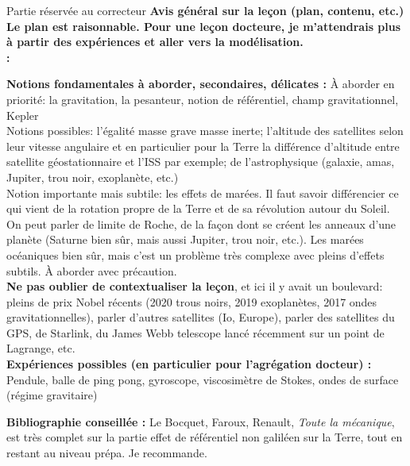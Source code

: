 \begin{reportBlock}{Partie réservée au correcteur}
  \textbf{Avis général sur la leçon (plan, contenu, etc.) Le plan est raisonnable. Pour une leçon docteure, je m'attendrais plus à partir des expériences et aller vers la modélisation.\\:}
  
  
  \textbf{Notions fondamentales à aborder, secondaires, délicates :} À aborder en priorité: la gravitation, la pesanteur, notion de référentiel, champ gravitationnel, Kepler \\
  
  Notions possibles: l'égalité masse grave masse inerte; l'altitude des satellites selon leur vitesse angulaire et en particulier pour la Terre la différence d'altitude entre satellite géostationnaire et l'ISS par exemple; de l'astrophysique (galaxie, amas, Jupiter, trou noir, exoplanète, etc.) \\
  
  Notion importante mais subtile: les effets de marées. Il faut savoir différencier ce qui vient de la rotation propre de la Terre et de sa révolution autour du Soleil. On peut parler de limite de Roche, de la façon dont se créent les anneaux d'une planète (Saturne bien sûr, mais aussi Jupiter, trou noir, etc.). Les marées océaniques bien sûr, mais c'est un problème très complexe avec pleins d'effets subtils. À aborder avec précaution. \\
  
  \textbf{Ne pas oublier de contextualiser la leçon}, et ici il y avait un boulevard: pleins de prix Nobel récents (2020 trous noirs, 2019 exoplanètes, 2017 ondes gravitationnelles), parler d'autres satellites (Io, Europe), parler des satellites du GPS, de Starlink, du James Webb telescope lancé récemment sur un point de Lagrange, etc.\\
  
  
  
  \textbf{Expériences possibles (en particulier pour l'agrégation docteur) :} Pendule, balle de ping pong, gyroscope, viscosimètre de Stokes, ondes de surface (régime gravitaire)
  
  
  \textbf{Bibliographie conseillée : }Le Bocquet, Faroux, Renault, \emph{Toute la mécanique}, est très complet sur la partie effet de référentiel non galiléen sur la Terre, tout en restant au niveau prépa. Je recommande.
\end{reportBlock}


